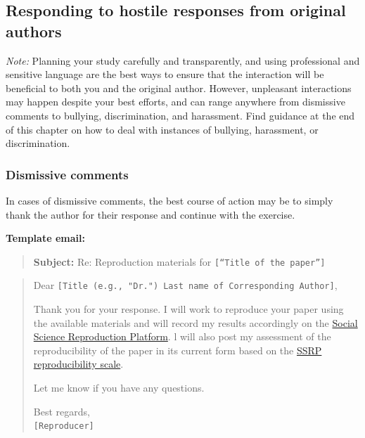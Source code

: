 \documentclass[]{book}
\begin{document}
\hypertarget{responding-to-hostile-responses-from-original-authors}{%
\subsection{Responding to hostile responses from original authors}\label{responding-to-hostile-responses-from-original-authors}}

\emph{Note:} Planning your study carefully and transparently, and using professional and sensitive language are the best ways to ensure that the interaction will be beneficial to both you and the original author. However, unpleasant interactions may happen despite your best efforts, and can range anywhere from dismissive comments to bullying, discrimination, and harassment. Find guidance at the end of this chapter on how to deal with instances of bullying, harassment, or discrimination.

\hypertarget{dismissive-comments}{%
\subsubsection{Dismissive comments}\label{dismissive-comments}}

In cases of dismissive comments, the best course of action may be to simply thank the author for their response and continue with the exercise.

\textbf{Template email:}

\begin{quote}
\textbf{Subject:} Re: Reproduction materials for \texttt{{[}“Title\ of\ the\ paper”{]}}
\end{quote}

\begin{quote}
Dear \texttt{{[}Title\ (e.g.,\ "Dr.")\ Last\ name\ of\ Corresponding\ Author{]}},

Thank you for your response. I will work to reproduce your paper using the available materials and will record my results accordingly on the \href{https://www.socialsciencereproduction.org/}{Social Science Reproduction Platform}. l will also post my assessment of the reproducibility of the paper in its current form based on the \href{https://bitss.github.io/ACRE/assessment.html\#levels-of-computational-reproducibility-for-a-specific-output}{SSRP reproducibility scale}.

Let me know if you have any questions.

Best regards,\\
\texttt{{[}Reproducer{]}}
\end{quote}
\end{document}
